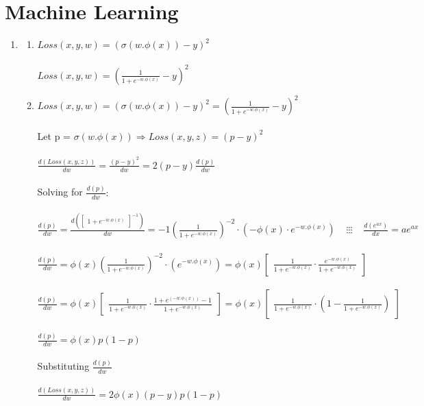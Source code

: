 \documentclass[12pt,letterpaper]{article}
\begin{document}
\section*{Machine Learning}
    \begin{enumerate}
            \item 
                \begin{enumerate}
                    \item
                    $ Loss(x,y,w) =  (\sigma (w. \phi (x)) - y)^2$ \\ \\
                    $Loss(x,y,w) = ( \frac{1}{1+ e^{-w. \phi (x)}} - y )^2$ \\
                    \item 
                    $Loss(x,y,w) = (\sigma (w. \phi (x)) - y)^2 = ( \frac{1}{1+ e^{-w. \phi (x)}} - y )^2$ \\ \\
                    Let p = $\sigma (w. \phi (x))  \Rightarrow Loss(x,y,z) = (p - y)^2$ \\ \\
                    $\frac{d(Loss(x,y,z))}{dw} = \frac{(p - y)^2}{dw}  = 2(p-y) \frac{d(p)}{dw}$ \\ \\
                    Solving for $\frac{d(p)}{dw}:$ \\ \\
                    $\frac{d(p)}{dw} =  \frac{d(\begin{bmatrix} 1+ e^{-w. \phi (x)} \end{bmatrix}^{-1} )}{dw} = -1(\frac{1}{1+ e^{-w. \phi (x)}})^{-2}\cdot (-\phi (x)\cdot  e^{-w. \phi (x)}) \;\;\;\; \vdots \vdots \vdots \;\;\;\;  \frac{d(e^{ax})}{dx} = ae^{ax}$ \\ \\
                    $\frac{d(p)}{dw} = \phi (x)(\frac{1}{1+ e^{-w. \phi (x)}})^{-2}\cdot (e^{-w. \phi (x)}) = \phi (x)  \begin{bmatrix}\frac{1}{1+ e^{-w. \phi (x)}} \cdot \frac{e^{-w. \phi (x)}}{1+ e^{-w. \phi (x)}}\end{bmatrix}$ \\ \\
                    $\frac{d(p)}{dw} = \phi (x)  \begin{bmatrix}\frac{1}{1+ e^{-w. \phi (x)}} \cdot \frac{1 + e^{(-w. \phi (x))}  -1}{1+ e^{-w. \phi (x)}}\end{bmatrix} = \phi (x)  \begin{bmatrix}\frac{1}{1+ e^{-w. \phi (x)}} \cdot (1 - \frac{1}{1+ e^{-w. \phi (x)}}) \end{bmatrix}$ \\ \\
                    $ \frac{d(p)}{dw} = \phi (x)p(1-p)$ \\ \\
                    Substituting $ \frac{d(p)}{dw}$ \\ \\
                    $\frac{d(Loss(x,y,z))}{dw} = 2\phi(x)(p-y)p(1-p)$ \\ \\
                    

\end{enumerate}
\end{enumerate}
\end{document}
